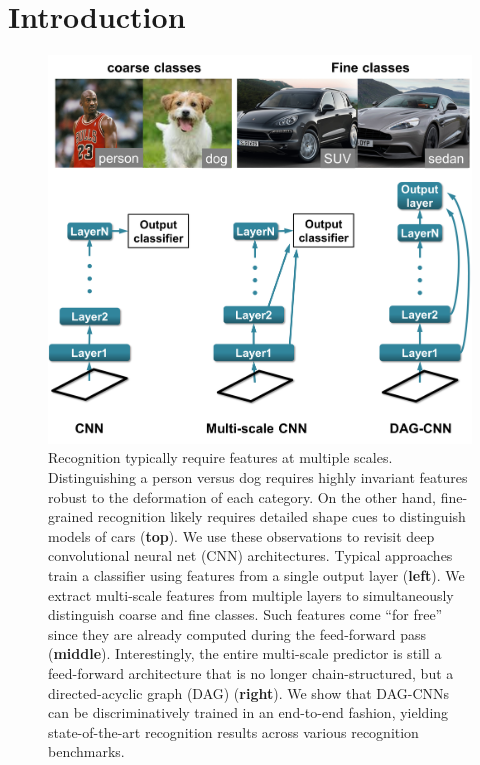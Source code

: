 \documentclass[10pt,twocolumn,letterpaper]{article}
\begin{document}
\section{Introduction}


\begin{figure}[t!]
\centering
\includegraphics[width=\columnwidth]{fig/splash}
\caption{Recognition typically require features at multiple scales. Distinguishing a person versus dog requires highly invariant features robust to the deformation of each category. On the other hand, fine-grained recognition likely requires detailed shape cues to distinguish models of cars ({\bf top}). We use these observations to revisit deep convolutional neural net (CNN) architectures. Typical approaches train a classifier using features from a single output layer ({\bf left}). We extract multi-scale features from multiple layers to simultaneously distinguish coarse and fine classes. Such features come ``for free'' since they are already computed during the feed-forward pass ({\bf middle}). Interestingly, the entire multi-scale predictor is still a feed-forward architecture that is no longer chain-structured, but a directed-acyclic graph (DAG) ({\bf right}). We show that DAG-CNNs can be discriminatively trained in an end-to-end fashion, yielding state-of-the-art recognition results across various recognition benchmarks. }%
\label{fig:splash}
\end{figure}
\end{document}
